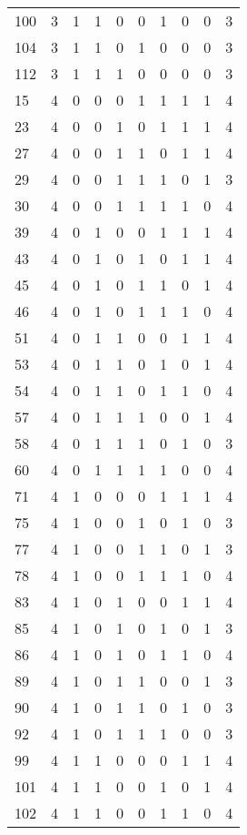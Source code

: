\documentclass[a4paper,UKenglish]{lipics-v2016}
\begin{document}
\begin{longtable}[c]{|p{}||p{}||p{} p{} p{} p{} p{} p{} p{}|p{}|}
			100 & 3 & 1 & 1 & 0 & 0 & 1 & 0 & 0 & 3 \\
			104 & 3 & 1 & 1 & 0 & 1 & 0 & 0 & 0 & 3 \\
			112 & 3 & 1 & 1 & 1 & 0 & 0 & 0 & 0 & 3 \\\hline
			15  & 4 & 0 & 0 & 0 & 1 & 1 & 1 & 1 & 4 \\
			23  & 4 & 0 & 0 & 1 & 0 & 1 & 1 & 1 & 4 \\
			27  & 4 & 0 & 0 & 1 & 1 & 0 & 1 & 1 & 4 \\
			29 	& 4 & 0 & 0 & 1 & 1 & 1 & 0 & 1 & 3 \\
			30  & 4 & 0 & 0 & 1 & 1 & 1 & 1 & 0 & 4 \\
			39  & 4 & 0 & 1 & 0 & 0 & 1 & 1 & 1 & 4 \\
			43  & 4 & 0 & 1 & 0 & 1 & 0 & 1 & 1 & 4 \\
			45  & 4 & 0 & 1 & 0 & 1 & 1 & 0 & 1 & 4 \\
			46  & 4 & 0 & 1 & 0 & 1 & 1 & 1 & 0 & 4 \\
			51  & 4 & 0 & 1 & 1 & 0 & 0 & 1 & 1 & 4 \\
			53  & 4 & 0 & 1 & 1 & 0 & 1 & 0 & 1 & 4 \\
			54  & 4 & 0 & 1 & 1 & 0 & 1 & 1 & 0 & 4 \\
			57  & 4 & 0 & 1 & 1 & 1 & 0 & 0 & 1 & 4 \\
			58  & 4 & 0 & 1 & 1 & 1 & 0 & 1 & 0 & 3 \\
			60	& 4 & 0 & 1 & 1 & 1 & 1 & 0 & 0 & 4 \\
			71  & 4 & 1 & 0 & 0 & 0 & 1 & 1 & 1 & 4 \\
			75  & 4 & 1 & 0 & 0 & 1 & 0 & 1 & 0 & 3 \\
			77  & 4 & 1 & 0 & 0 & 1 & 1 & 0 & 1 & 3 \\
			78  & 4 & 1 & 0 & 0 & 1 & 1 & 1 & 0 & 4 \\
			83  & 4 & 1 & 0 & 1 & 0 & 0 & 1 & 1 & 4 \\
			85  & 4 & 1 & 0 & 1 & 0 & 1 & 0 & 1 & 3 \\
			86  & 4 & 1 & 0 & 1 & 0 & 1 & 1 & 0 & 4 \\
			89  & 4 & 1 & 0 & 1 & 1 & 0 & 0 & 1 & 3 \\
			90  & 4 & 1 & 0 & 1 & 1 & 0 & 1 & 0 & 3 \\
			92  & 4 & 1 & 0 & 1 & 1 & 1 & 0 & 0 & 3 \\
			99  & 4 & 1 & 1 & 0 & 0 & 0 & 1 & 1 & 4 \\
			101 & 4 & 1 & 1 & 0 & 0 & 1 & 0 & 1 & 4 \\
			102 & 4 & 1 & 1 & 0 & 0 & 1 & 1 & 0 & 4 \\	

\end{longtable}
\end{document}
